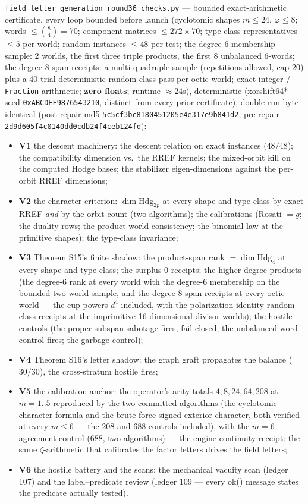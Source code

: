 \documentclass[11pt]{article}
\newcommand{\Hdg}{\mathrm{Hdg}}
\begin{document}
\texttt{field\_letter\_generation\_round36\_checks.py} --- bounded
exact-arithmetic certificate, every loop bounded before launch (cyclotomic
shapes $m\le24$, $\varphi\le8$; words $\le\binom{8}{4}=70$; component matrices
$\le272\times70$; type-class representatives $\le5$ per world; random instances
$\le48$ per test; the degree-6 membership sample: 2 worlds, the first three
triple products, the first 8 unbalanced 6-words; the degree-8 span receipts:
a multi-quadruple sample (repetitions allowed, cap 20) plus a 40-trial
deterministic random-class pass per octic world; exact integer /
\texttt{Fraction} arithmetic; \textbf{zero floats}; runtime $\approx24$s),
deterministic (xorshift64* seed \texttt{0xABCDEF9876543210}, distinct from
every prior certificate), double-run byte-identical (post-repair md5
\texttt{5c5cf3bc8180451205e4e317e9b841d2}; pre-repair
\texttt{2d9d605f4c0140dd0cdb24f4ceb124fd}):
\begin{itemize}
\item \textbf{V1} the descent machinery: the descent relation on exact instances
($48/48$); the compatibility dimension vs.\ the RREF kernels; the mixed-orbit
kill on the computed Hodge bases; the stabilizer eigen-dimensions against the
per-orbit RREF dimensions;
\item \textbf{V2} the character criterion: $\dim\Hdg_{2p}$ at every shape and
type class by exact RREF \emph{and} by the orbit-count (two algorithms); the
calibrations (Rosati $=g$; the duality rows; the product-world consistency; the
binomial law at the primitive shapes); the type-class invariance;
\item \textbf{V3} Theorem S15's finite shadow: the product-span rank
$=\dim\Hdg_4$ at every shape and type class; the surplus-$0$ receipts; the
higher-degree products (the degree-6 rank at every world with the degree-6
membership on the bounded two-world sample, and the degree-8 span receipts at
every octic world --- the cup-powers $d^4$ included, with the
polarization-identity random-class receipts at the imprimitive
16-dimensional-divisor worlds); the hostile controls (the proper-subspan
sabotage fires, fail-closed; the unbalanced-word control fires; the garbage
control);
\item \textbf{V4} Theorem S16's letter shadow: the graph graft propagates the
balance ($30/30$), the cross-stratum hostile fires;
\item \textbf{V5} the calibration anchor: the operator's arity totals
$4,8,24,64,208$ at $m{=}1..5$ reproduced by the two committed algorithms (the
cyclotomic character formula and the brute-force signed exterior character,
both verified at every $m\le6$ --- the $208$ and $688$ controls included),
with the $m=6$ agreement control ($688$, two algorithms) --- the
engine-continuity receipt: the same $\zeta$-arithmetic that calibrates the
factor letters drives the field letters;
\item \textbf{V6} the hostile battery and the scans: the mechanical vacuity
scan (ledger 107) and the label--predicate review (ledger 109 --- every ok()
message states the predicate actually tested).
\end{itemize}
\end{document}
